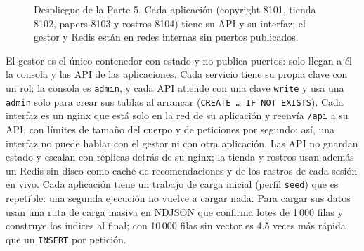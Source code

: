 \begin{figure}[H]
\centering
{}
\caption{Despliegue de la Parte 5. Cada aplicación (copyright 8101, tienda 8102, papers
8103 y rostros 8104) tiene su API y su interfaz; el gestor y Redis están en redes internas
sin puertos publicados.}
\label{fig:servicios}
\end{figure}

El gestor es el único contenedor con estado y no publica puertos: solo llegan a él la
consola y las API de las aplicaciones. Cada servicio tiene su propia clave con un rol: la
consola es \texttt{admin}, y cada API atiende con una clave \texttt{write} y usa una
\texttt{admin} solo para crear sus tablas al arrancar (\texttt{CREATE \ldots{} IF NOT
EXISTS}). Cada interfaz es un nginx que está solo en la red de su aplicación y reenvía
\texttt{/api} a su API, con límites de tamaño del cuerpo y de peticiones por segundo; así,
una interfaz no puede hablar con el gestor ni con otra aplicación. Las API no guardan
estado y escalan con réplicas detrás de su nginx; la tienda y rostros usan además un Redis
sin disco como caché de recomendaciones y de los rastros de cada sesión en vivo. Cada aplicación tiene un trabajo de carga inicial (perfil
\texttt{seed}) que es repetible: una segunda ejecución no vuelve a cargar nada. Para
cargar sus datos usan una ruta de carga masiva en NDJSON que confirma lotes de 1\,000 filas
y construye los índices al final; con 10\,000 filas sin vector es 4.5 veces más rápida que
un \texttt{INSERT} por petición.
